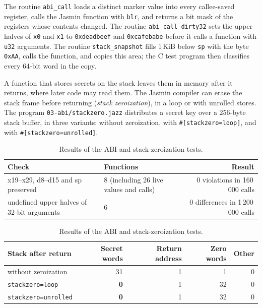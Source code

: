 \documentclass[11pt,a4paper]{article}
\newcommand{\file}[1]{\texttt{#1}}
\begin{document}


The routine \texttt{abi\_call} loads a distinct marker value into every
callee-saved register, calls the Jasmin function with \texttt{blr}, and
returns a bit mask of the registers whose contents changed. The routine
\texttt{abi\_call\_dirty32} sets the upper halves of \texttt{x0} and
\texttt{x1} to \texttt{0xdeadbeef} and \texttt{0xcafebabe} before it calls a
function with \texttt{u32} arguments. The routine \texttt{stack\_snapshot}
fills 1\,KiB below \texttt{sp} with the byte \texttt{0xAA}, calls the
function, and copies this area; the C test program then classifies every
64-bit word in the copy.

A function that stores secrets on the stack leaves them in memory after it
returns, where later code may read them. The Jasmin compiler can erase the
stack frame before returning (\emph{stack zeroization}), in a loop or with
unrolled stores. The program \file{03-abi/stackzero.jazz} distributes a
secret key over a 256-byte stack buffer, in three variants: without
zeroization, with \texttt{\#[stackzero=loop]}, and with
\texttt{\#[stackzero=unrolled]}.

\begin{table}[h]
\centering\small
\begin{tabularx}{\textwidth}{@{}XXr@{}}
\toprule
\textbf{Check} & \textbf{Functions} & \textbf{Result} \\
\midrule
x19--x29, d8--d15 and sp preserved & 8 (including 26 live values and calls) & 0 violations in 160\,000 calls \\
undefined upper halves of 32-bit arguments & 6 & 0 differences in 1\,200\,000 calls \\
\bottomrule
\end{tabularx}

\vspace{6pt}
\begin{tabular}{@{}lrrrr@{}}
\toprule
\textbf{Stack after return} & \textbf{Secret words} & \textbf{Return address} & \textbf{Zero words} & \textbf{Other} \\
\midrule
without zeroization & 31 & 1 & 1 & 0 \\
\texttt{stackzero=loop} & \textbf{0} & 1 & 32 & 0 \\
\texttt{stackzero=unrolled} & \textbf{0} & 1 & 32 & 0 \\
\bottomrule
\end{tabular}
\caption{Results of the ABI and stack-zeroization tests.}
\end{table}
\end{document}
